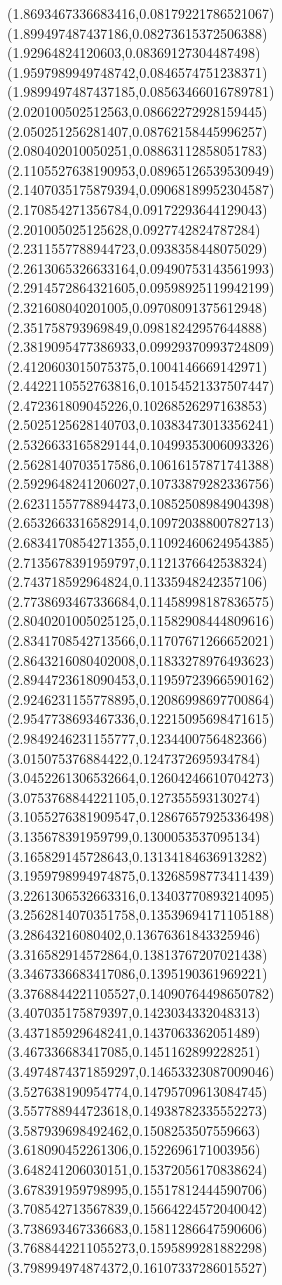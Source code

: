 {(1.8693467336683416,0.08179221786521067)
(1.899497487437186,0.08273615372506388)
(1.92964824120603,0.08369127304487498)
(1.9597989949748742,0.0846574751238371)
(1.9899497487437185,0.08563466016789781)
(2.020100502512563,0.08662272928159445)
(2.050251256281407,0.08762158445996257)
(2.080402010050251,0.08863112858051783)
(2.1105527638190953,0.08965126539530949)
(2.1407035175879394,0.09068189952304587)
(2.170854271356784,0.09172293644129043)
(2.201005025125628,0.0927742824787284)
(2.2311557788944723,0.0938358448075029)
(2.2613065326633164,0.09490753143561993)
(2.2914572864321605,0.09598925119942199)
(2.321608040201005,0.09708091375612948)
(2.351758793969849,0.09818242957644888)
(2.3819095477386933,0.09929370993724809)
(2.4120603015075375,0.1004146669142971)
(2.4422110552763816,0.10154521337507447)
(2.472361809045226,0.10268526297163853)
(2.5025125628140703,0.10383473013356241)
(2.5326633165829144,0.10499353006093326)
(2.5628140703517586,0.10616157871741388)
(2.5929648241206027,0.10733879282336756)
(2.6231155778894473,0.10852508984904398)
(2.6532663316582914,0.10972038800782713)
(2.6834170854271355,0.11092460624954385)
(2.7135678391959797,0.1121376642538324)
(2.743718592964824,0.11335948242357106)
(2.7738693467336684,0.11458998187836575)
(2.8040201005025125,0.11582908444809616)
(2.8341708542713566,0.11707671266652021)
(2.8643216080402008,0.11833278976493623)
(2.8944723618090453,0.11959723966590162)
(2.9246231155778895,0.12086998697700864)
(2.9547738693467336,0.12215095698471615)
(2.9849246231155777,0.1234400756482366)
(3.015075376884422,0.1247372695934784)
(3.0452261306532664,0.12604246610704273)
(3.0753768844221105,0.127355593130274)
(3.1055276381909547,0.12867657925336498)
(3.135678391959799,0.1300053537095134)
(3.165829145728643,0.13134184636913282)
(3.1959798994974875,0.13268598773411439)
(3.2261306532663316,0.13403770893214095)
(3.2562814070351758,0.13539694171105188)
(3.28643216080402,0.13676361843325946)
(3.316582914572864,0.13813767207021438)
(3.3467336683417086,0.1395190361969221)
(3.3768844221105527,0.14090764498650782)
(3.407035175879397,0.1423034332048313)
(3.437185929648241,0.1437063362051489)
(3.467336683417085,0.1451162899228251)
(3.4974874371859297,0.14653323087009046)
(3.527638190954774,0.14795709613084745)
(3.557788944723618,0.14938782335552273)
(3.587939698492462,0.1508253507559663)
(3.618090452261306,0.1522696171003956)
(3.648241206030151,0.15372056170838624)
(3.678391959798995,0.15517812444590706)
(3.708542713567839,0.15664224572040042)
(3.738693467336683,0.15811286647590606)
(3.7688442211055273,0.1595899281882298)
(3.798994974874372,0.16107337286015527)
}
